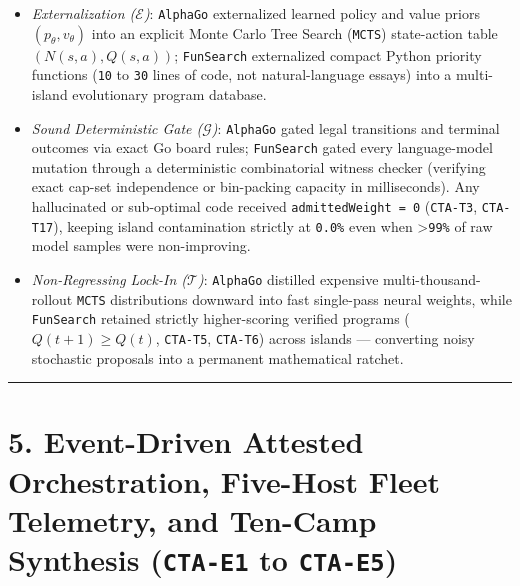 \documentclass[10pt,letterpaper]{article}
\providecommand{\tightlist}{\setlength{\itemsep}{1pt}\setlength{\parskip}{0pt}}
\begin{document}
\begin{enumerate}
  \begin{itemize}
  \tightlist
  \item
    \emph{Externalization (\(\mathcal{E}\))}: \texttt{AlphaGo}
    externalized learned policy and value priors
    \((p_\theta, v_\theta)\) into an explicit Monte Carlo Tree Search
    (\texttt{MCTS}) state-action table \((N(s,a), Q(s,a))\);
    \texttt{FunSearch} externalized compact Python priority functions
    (\texttt{10} to \texttt{30} lines of code, not natural-language
    essays) into a multi-island evolutionary program database.
  \item
    \emph{Sound Deterministic Gate (\(\mathcal{G}\))}: \texttt{AlphaGo}
    gated legal transitions and terminal outcomes via exact Go board
    rules; \texttt{FunSearch} gated every language-model mutation
    through a deterministic combinatorial witness checker (verifying
    exact cap-set independence or bin-packing capacity in milliseconds).
    Any hallucinated or sub-optimal code received
    \texttt{admittedWeight\ =\ 0} (\texttt{CTA-T3}, \texttt{CTA-T17}),
    keeping island contamination strictly at \texttt{0.0\%} even when
    \textgreater{}\texttt{99\%} of raw model samples were non-improving.
  \item
    \emph{Non-Regressing Lock-In (\(\mathcal{T}\))}: \texttt{AlphaGo}
    distilled expensive multi-thousand-rollout \texttt{MCTS}
    distributions downward into fast single-pass neural weights, while
    \texttt{FunSearch} retained strictly higher-scoring verified
    programs (\(Q(t+1) \ge Q(t)\), \texttt{CTA-T5}, \texttt{CTA-T6})
    across islands --- converting noisy stochastic proposals into a
    permanent mathematical ratchet.
  \end{itemize}
\end{enumerate}

\begin{center}\rule{0.5\linewidth}{0.5pt}\end{center}

\section{\texorpdfstring{5. Event-Driven Attested Orchestration,
Five-Host Fleet Telemetry, and Ten-Camp Synthesis (\texttt{CTA-E1} to
\texttt{CTA-E5})}{5. Event-Driven Attested Orchestration, Five-Host Fleet Telemetry, and Ten-Camp Synthesis (CTA-E1 to CTA-E5)}}\label{event-driven-attested-orchestration-five-host-fleet-telemetry-and-ten-camp-synthesis-cta-e1-to-cta-e5}
\end{document}
